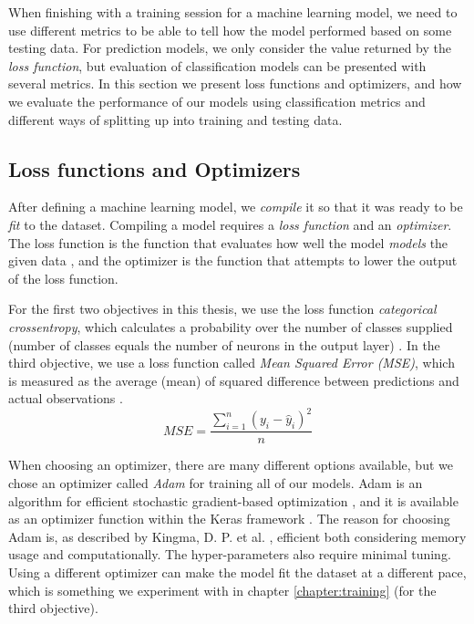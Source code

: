 When finishing with a training session for a machine learning model, we need to use different metrics to be able to tell how the model performed based on some testing data. For prediction models, we only consider the value returned by the \textit{loss function}, but evaluation of classification models can be presented with several metrics. In this section we present loss functions and optimizers, and how we evaluate the performance of our models using classification metrics and different ways of splitting up into training and testing data.

\subsection{Loss functions and Optimizers}

After defining a machine learning model, we \textit{compile} it so that it was ready to be \textit{fit} to the dataset. Compiling a model requires a \textit{loss function} and an \textit{optimizer}. The loss function is the function that evaluates how well the model \textit{models} the given data \cite{loss_functions}, and the optimizer is the function that attempts to lower the output of the loss function. 

For the first two objectives in this thesis, we use the loss function \textit{categorical crossentropy}, which calculates a probability over the number of classes supplied (number of classes equals the number of neurons in the output layer) \cite{cross_entropy}. In the third objective, we use a loss function called \textit{Mean Squared Error (MSE)}, which is measured as the average (mean) of squared difference between predictions and actual observations \cite{loss_functions}. 
\[ MSE = \frac{\sum_{i=1}^{n}(y_i-\hat{y}_i)^2}{n} \]

When choosing an optimizer, there are many different options available, but we chose an optimizer called \textit{Adam} for training all of our models. Adam is an algorithm for efficient stochastic gradient-based optimization \cite{adam}, and it is available as an optimizer function within the Keras framework \cite{keras_docs}. The reason for choosing Adam is, as described by Kingma, D. P. et al. \cite{adam}, efficient both considering memory usage and computationally. The hyper-parameters also require minimal tuning. Using a different optimizer can make the model fit the dataset at a different pace, which is something we experiment with in chapter \ref{chapter:training} (for the third objective). 


